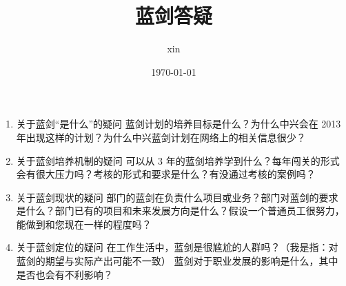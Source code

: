 \documentclass[11pt]{article}
\author{xin}
\date{\today}
\title{蓝剑答疑}
\begin{document}
\maketitle
\tableofcontents

\begin{enumerate}
\item 关于蓝剑“是什么”的疑问
蓝剑计划的培养目标是什么？为什么中兴会在 2013 年出现这样的计划？为什么中兴蓝剑计划在网络上的相关信息很少？
\item 关于蓝剑培养机制的疑问
可以从 3 年的蓝剑培养学到什么？每年闯关的形式会有很大压力吗？考核的形式和要求是什么？有没通过考核的案例吗？
\item 关于蓝剑现状的疑问
部门的蓝剑在负责什么项目或业务？部门对蓝剑的要求是什么？部门已有的项目和未来发展方向是什么？假设一个普通员工很努力，能做到和您现在一样的程度吗？
\item 关于蓝剑定位的疑问
在工作生活中，蓝剑是很尴尬的人群吗？（我是指：对蓝剑的期望与实际产出可能不一致）
蓝剑对于职业发展的影响是什么，其中是否也会有不利影响？
\end{enumerate}
\end{document}

